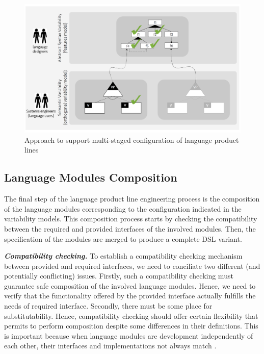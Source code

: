 \begin{figure}
  \centering\includegraphics[width=1\linewidth]{images/languages-configuration-fig.png}
  \caption{Approach to support multi-staged configuration of language product lines}
  \label{fig:languages-configuration-modeling}
\end{figure}

\subsection{Language Modules Composition}

The final step of the language product line engineering process is the composition of the language modules corresponding to the configuration indicated in the variability models. This composition process starts by checking the compatibility between the required and provided interfaces of the involved modules. Then, the specification of the modules are merged to produce a complete DSL variant.  

\vspace{2mm}
\textbf{\textit{Compatibility checking.}} To establish a compatibility checking mechanism between provided and required interfaces, we need to conciliate two different (and potentially conflicting) issues. Firstly, such a compatibility checking must guarantee safe composition of the involved language modules. Hence, we need to verify that the functionality offered by the provided interface actually fulfills the needs of required interface. Secondly, there must be some place for substitutability. Hence, compatibility checking should offer certain flexibility that permits to perform composition despite some differences in their definitions. This is important because when language modules are development independently of each other, their interfaces and implementations not always match \cite{Gschwind:2012}.

